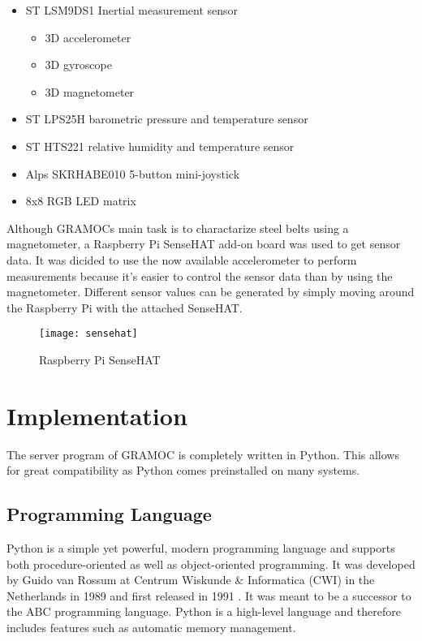 \begin{itemize}
	\item ST LSM9DS1 Inertial measurement sensor
		\begin{itemize}
			\item 3D accelerometer
			\item 3D gyroscope
			\item 3D magnetometer
		\end{itemize}
	\item ST LPS25H barometric pressure and temperature sensor
	\item ST HTS221 relative humidity and temperature sensor
	\item Alps SKRHABE010 5-button mini-joystick
	\item 8x8 RGB LED matrix
\end{itemize}

Although GRAMOCs main task is to charactarize steel belts using a magnetometer, a Raspberry Pi SenseHAT add-on board was used to get sensor data. It was dicided to use the now available accelerometer to perform measurements because it's easier to control the sensor data than by using the magnetometer. Different sensor values can be generated by simply moving around the Raspberry Pi with the attached SenseHAT.

\begin{figure}[H]
	\centering
	\texttt{[image: sensehat]}
	\caption[Raspberry Pi SenseHAT]{Raspberry Pi SenseHAT\footnotemark}
	\label{fig:sensehat}
\end{figure}


\section{Implementation}

The server program of GRAMOC is completely written in Python. This allows for great compatibility as Python comes preinstalled on many systems.

\subsection{Programming Language}

Python is a simple yet powerful, modern programming language and supports both procedure-oriented as well as object-oriented programming. It was developed by Guido van Rossum at Centrum Wiskunde \& Informatica (CWI) in the Netherlands in 1989 and first released in 1991 \autocite{HistoryOfPython}. It was meant to be a successor to the ABC programming language. Python is a high-level language and therefore includes features such as automatic memory management.

